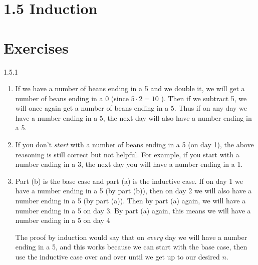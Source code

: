\documentclass[11pt,]{book}
\theoremstyle{ptxplainnotitle}
\theoremstyle{ptxplaintitle}
\theoremstyle{ptxdefinitionnotitle}
\theoremstyle{ptxdefinitiontitle}
\theoremstyle{ptxdefinitionnotitle}
\theoremstyle{ptxdefinitiontitle}
\theoremstyle{ptxdefinitionnotitle}
\theoremstyle{ptxdefinitiontitle}
\theoremstyle{ptxdefinitiontitlenonumber}
\theoremstyle{ptxdefinitiontitlenonumber}
\numberwithin{equation}{chapter}
\begin{document}
\section*{1.5 Induction}
\section*{Exercises}
\begin{divisionexercise}{1.5.1}
\textbf{}\hypertarget{p-590}{}%
\leavevmode%
\begin{enumerate}[label=(\alph*)]
\item\hypertarget{li-247}{}\hypertarget{p-591}{}%
If we have a number of beans ending in a 5 and we double it, we will get a number of beans ending in a 0 (since \(5\cdot 2 = 10\) ).  Then if we subtract 5, we will once again get a number of beans ending in a 5.  Thus if on any day we have a number ending in a 5, the next day will also have a number ending in a 5.%
\item\hypertarget{li-248}{}\hypertarget{p-592}{}%
If you don't \emph{start} with a number of beans ending in a 5 (on day 1), the above reasoning is still correct but not helpful.  For example, if you start with a number ending in a 3, the next day you will have a number ending in a 1.%
\item\hypertarget{li-249}{}\hypertarget{p-593}{}%
Part (b) is the base case and part (a) is the inductive case.  If on day 1 we have a number ending in a 5 (by part (b)), then on day 2 we will also have a number ending in a 5 (by part (a)).  Then by part (a) again, we will have a number ending in a 5 on day 3.  By part (a) again, this means we will have a number ending in a 5 on day 4%
\par
\hypertarget{p-594}{}%
The proof by induction would say that on \emph{every} day we will have a number ending in a 5, and this works because we can start with the base case, then use the inductive case over and over until we get up to our desired \(n\).%
\end{enumerate}
%
\end{divisionexercise}%
\end{document}
